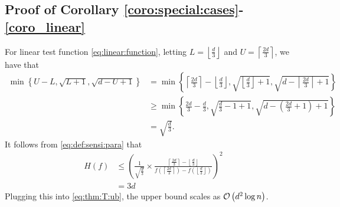 \documentclass[onecolumn,letterpaper]{IEEEtran}
\newcommand{\cO}{{\cal O}}
\newcommand{\up}{{U}}
\newcommand{\lw}{{L}}
\newcommand{\fH}{{H(f)}}
\begin{document}
\subsection{Proof of Corollary \ref{coro:special:cases}-\ref{coro_linear}}
\label{app:coro_linear}
\begin{IEEEproof}
For linear test function \eqref{eq:linear:function}, letting $\lw = \left \lfloor \frac{d}{3} \right \rfloor$ and $\up = \left \lceil \frac{2d}{3} \right \rceil$, we have that 
\begin{align*}
\min\left\{\up-\lw , \sqrt{\lw+1} , \sqrt{d-\up+1}\right\} &= \min \left\{ \left \lceil \frac{2d}{3} \right \rceil- \left \lfloor \frac{d}{3} \right \rfloor , \sqrt{ \left \lfloor \frac{d}{3} \right \rfloor+1} , \sqrt{d-\left \lceil \frac{2d}{3} \right \rceil+1} \right\}\\
 &\geq \min \left\{ \frac{2d}{3}-  \frac{d}{3} , \sqrt{ \frac{d}{3} -1+1} , \sqrt{d-\left(\frac{2d}{3} +1\right)+1} \right\}\\
 &=\sqrt{\frac d 3}.
\end{align*}
It follows from \eqref{eq:def:sensi:para} that 
\begin{align*}
    \fH &\leq \left( \frac{1}{\sqrt{\frac d 3}} \times\frac{\left \lceil \frac{2d}{3} \right \rceil- \left \lfloor \frac{d}{3} \right \rfloor}{f\left(\left \lceil \frac{2d}{3} \right \rceil\right)-f\left( \left \lfloor \frac{d}{3} \right \rfloor\right)} \right)^2\\
    &=3d%
\end{align*}
Plugging this into \eqref{eq:thm:T:ub}, the upper bound scales as $\cO \left( d^2 \log n\right)$. 


\end{IEEEproof}
\end{document}
